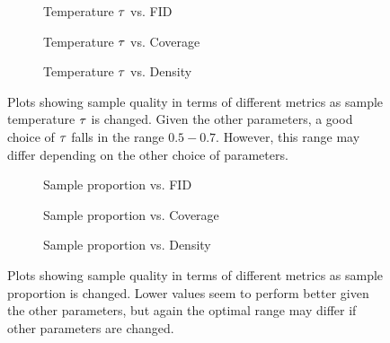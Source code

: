 \begin{figure}[ht!]
    \begin{subfigure}[b]{0.33\textwidth}
        \centering
        \resizebox{\textwidth}{!}{
            
        }
        \caption{Temperature $\tau$ vs. FID}
    \end{subfigure}
    \hfill
    \begin{subfigure}[b]{0.33\textwidth}
        \centering
        \resizebox{\textwidth}{!}{
            
        }
        \caption{Temperature $\tau$ vs. Coverage}
    \end{subfigure}
    \hfill
    \begin{subfigure}[b]{0.33\textwidth}
        \centering
        \resizebox{\textwidth}{!}{
            
        }
        \caption{Temperature $\tau$ vs. Density}
    \end{subfigure}
    \caption{
        Plots showing sample quality in terms of different metrics as sample
        temperature $\tau$ is changed. Given the other parameters, a good choice
        of $\tau$ falls in the range $0.5-0.7$. However, this range may
        differ depending on the other choice of parameters.
    }
    \label{fig:temp}
\end{figure}

\begin{figure}[ht!]
    \begin{subfigure}[b]{0.33\textwidth}
        \centering
        \resizebox{\textwidth}{!}{
            
        }
        \caption{Sample proportion vs. FID}
    \end{subfigure}
    \hfill
    \begin{subfigure}[b]{0.33\textwidth}
        \centering
        \resizebox{\textwidth}{!}{
            
        }
        \caption{Sample proportion vs. Coverage}
    \end{subfigure}
    \hfill
    \begin{subfigure}[b]{0.33\textwidth}
        \centering
        \resizebox{\textwidth}{!}{
            
        }
        \caption{Sample proportion vs. Density}
    \end{subfigure}
    \caption{
        Plots showing sample quality in terms of different metrics as sample
        proportion is changed. Lower values seem to perform better given the
        other parameters, but again the optimal range may differ if other
        parameters are changed.
    }
    \label{fig:prop}
\end{figure}

